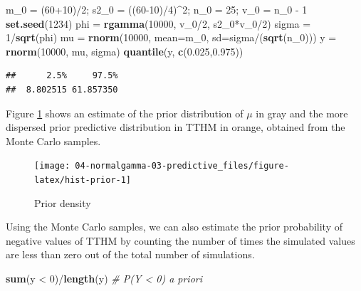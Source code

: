 \documentclass[]{book}
\newenvironment{Shaded}{\begin{snugshade}}{\end{snugshade}}
\newcommand{\KeywordTok}[1]{\textcolor[rgb]{0.13,0.29,0.53}{\textbf{{#1}}}}
\newcommand{\DataTypeTok}[1]{\textcolor[rgb]{0.13,0.29,0.53}{{#1}}}
\newcommand{\DecValTok}[1]{\textcolor[rgb]{0.00,0.00,0.81}{{#1}}}
\newcommand{\FloatTok}[1]{\textcolor[rgb]{0.00,0.00,0.81}{{#1}}}
\newcommand{\StringTok}[1]{\textcolor[rgb]{0.31,0.60,0.02}{{#1}}}
\newcommand{\CommentTok}[1]{\textcolor[rgb]{0.56,0.35,0.01}{\textit{{#1}}}}
\newcommand{\NormalTok}[1]{{#1}}
\theoremstyle{definition}
\theoremstyle{definition}
\theoremstyle{definition}
\theoremstyle{remark}
\begin{document}
\begin{Shaded}
\begin{Highlighting}[]
\NormalTok{m_0 =}\StringTok{ }\NormalTok{(}\DecValTok{60+10}\NormalTok{)/}\DecValTok{2}\NormalTok{; s2_0 =}\StringTok{ }\NormalTok{((}\DecValTok{60-10}\NormalTok{)/}\DecValTok{4}\NormalTok{)^}\DecValTok{2}\NormalTok{;}
\NormalTok{n_0 =}\StringTok{ }\DecValTok{25}\NormalTok{; v_0 =}\StringTok{ }\NormalTok{n_0 -}\StringTok{ }\DecValTok{1}
\KeywordTok{set.seed}\NormalTok{(}\DecValTok{1234}\NormalTok{)}
\NormalTok{phi =}\StringTok{ }\KeywordTok{rgamma}\NormalTok{(}\DecValTok{10000}\NormalTok{, v_0/}\DecValTok{2}\NormalTok{, s2_0*v_0/}\DecValTok{2}\NormalTok{)}
\NormalTok{sigma =}\StringTok{ }\DecValTok{1}\NormalTok{/}\KeywordTok{sqrt}\NormalTok{(phi)}
\NormalTok{mu =}\StringTok{ }\KeywordTok{rnorm}\NormalTok{(}\DecValTok{10000}\NormalTok{, }\DataTypeTok{mean=}\NormalTok{m_0, }\DataTypeTok{sd=}\NormalTok{sigma/(}\KeywordTok{sqrt}\NormalTok{(n_0)))}
\NormalTok{y =}\StringTok{ }\KeywordTok{rnorm}\NormalTok{(}\DecValTok{10000}\NormalTok{, mu, sigma)}
\KeywordTok{quantile}\NormalTok{(y, }\KeywordTok{c}\NormalTok{(}\FloatTok{0.025}\NormalTok{,}\FloatTok{0.975}\NormalTok{))}
\end{Highlighting}
\end{Shaded}

\begin{verbatim}
##      2.5%     97.5% 
##  8.802515 61.857350
\end{verbatim}

Figure \ref{fig:hist-prior} shows an estimate of the prior distribution
of \(\mu\) in gray and the more dispersed prior predictive distribution
in TTHM in orange, obtained from the Monte Carlo samples.

\begin{figure}

{\centering \texttt{[image: 04-normalgamma-03-predictive\_files/figure-latex/hist-prior-1]} 

}

\caption{Prior density}\label{fig:hist-prior}
\end{figure}

Using the Monte Carlo samples, we can also estimate the prior
probability of negative values of TTHM by counting the number of times
the simulated values are less than zero out of the total number of
simulations.

\begin{Shaded}
\begin{Highlighting}[]
\KeywordTok{sum}\NormalTok{(y <}\StringTok{ }\DecValTok{0}\NormalTok{)/}\KeywordTok{length}\NormalTok{(y)  }\CommentTok{# P(Y < 0) a priori}
\end{Highlighting}
\end{Shaded}
\end{document}
